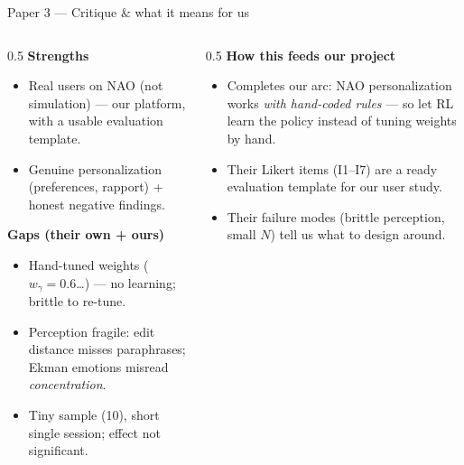 \documentclass[aspectratio=169,10pt]{beamer}
\begin{document}
\begin{frame}{Paper 3 --- Critique \& what it means for us}
  \begin{columns}[T]
    \begin{column}{0.5\textwidth}
      \textbf{Strengths}
      \begin{itemize}\footnotesize
        \item \alert{Real users on NAO} (not simulation) --- our platform, with a usable evaluation template.
        \item Genuine personalization (preferences, rapport) + honest negative findings.
      \end{itemize}
      \textbf{Gaps (their own + ours)}
      \begin{itemize}\footnotesize
        \item \alert{Hand-tuned weights} ($w_\gamma{=}0.6$\ldots) --- no learning; brittle to re-tune.
        \item Perception fragile: edit distance misses paraphrases; Ekman emotions misread \emph{concentration}.
        \item Tiny sample (10), short single session; effect not significant.
      \end{itemize}
    \end{column}
    \begin{column}{0.5\textwidth}
      \textbf{How this feeds our project}
      \begin{itemize}\footnotesize
        \item Completes our arc: NAO personalization works \emph{with hand-coded rules} --- so \alert{let RL learn the policy} instead of tuning weights by hand.
        \item Their Likert items (I1--I7) are a ready \alert{evaluation template} for our user study.
        \item Their failure modes (brittle perception, small $N$) tell us what to design around.
      \end{itemize}
    \end{column}
  \end{columns}
\end{frame}
\end{document}
